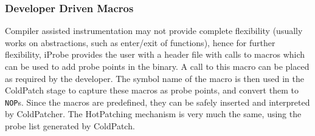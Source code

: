 \subsubsection{Developer Driven Macros}
Compiler assisted instrumentation may not provide complete flexibility (usually works on abstractions, such as enter/exit of functions), hence for further flexibility, iProbe provides the user with a header file with calls to macros which can be used to add probe points in the binary.
A call to this macro can be placed as required by the developer. 
The symbol name of the macro is then used in the ColdPatch stage to capture these macros as probe points, and convert them to \texttt{NOP}s.
Since the macros are predefined, they can be safely inserted and interpreted by ColdPatcher.
The HotPatching mechanism is very much the same, using the probe list generated by ColdPatch.
